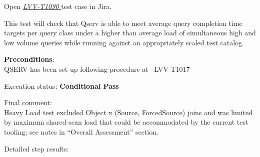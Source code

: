 \documentclass[DM,lsstdraft,STR,toc]{lsstdoc}
\begin{document}
Open  \href{https://jira.lsstcorp.org/secure/Tests.jspa#/testCase/LVV-T1090}{\textit{ LVV-T1090 } }
test case in Jira.

    This test will check that Qserv is able to meet average query completion
time targets per query class under a higher than average load of
simultaneous high and low volume queries while running against an
appropriately scaled test catalog.


    \textbf{ Preconditions}:\\
    QSERV has been set-up following procedure at ~LVV-T1017


    Execution status: {\bf Conditional Pass }

    Final comment:\\Heavy Load test excluded Object x (Source, ForcedSource) joins and was
limited by maximum shared-scan load that could be accommodated by the
current test tooling; see notes in ``Overall Assessment'' section.



    Detailed step results:
\end{document}

